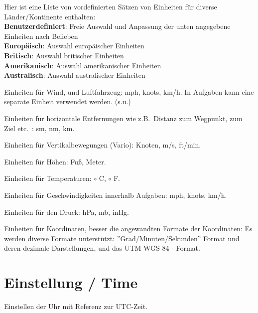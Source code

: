 \begin{description}\itemsep
\item[Vorauswahl] Hier ist eine Liste von vordefinierten Sätzen von Einheiten für diverse Länder/Kontinente enthalten:\\
{\bf Benutzerdefiniert}: Freie Auswahl und Anpassung der unten angegebene Einheiten nach Belieben\\
{\bf Europäisch}: Auswahl europäischer Einheiten   \\
{\bf Britisch}:   Auswahl britischer  Einheiten\\
{\bf Amerikanisch}:   Auswahl amerikanischer Einheiten\\
{\bf Australisch}:   Auswahl australischer Einheiten
\item[Luftfahrzeug-/Windgeschwindigkeit$\star$]  Einheiten für Wind, und Luftfahrzeug: mph, knots, km/h.
    In Aufgaben kann eine separate Einheit verwendet werden. (s.u.)
\item[Entfernungen$\star$] Einheiten für horizontale Entfernungen wie z.B.\  Distanz zum Wegpunkt, zum Ziel
    etc.\ : sm, nm, km.
\item[Steigen/Sinken$\star$] Einheiten für Vertikalbewegungen (Vario): Knoten,  m/s, ft/min.
\item[Höhen$\star$] Einheiten für Höhen: Fuß, Meter.
\item[Temperaturen$\star$] Einheiten für Temperaturen: $\circ$ C, $\circ$ F.
\item[Aufgaben-Geschwindigkeiten$\star$] Einheiten für Geschwindigkeiten innerhalb Aufgaben: mph, knots,
    km/h.
\item[Druck$\star$]  Einheiten für den Druck: hPa, mb, inHg.
\item[Geographische Länge und Breite$\star$]  Einheiten für Koordinaten, besser die angewandten Formate
    der Koordinaten:  Es werden diverse Formate unterstützt:  ''Grad/Minuten/Sekunden'' Format und
    deren dezimale Darstellungen,  und das UTM WGS 84 - Format.
\end{description}


\section{Einstellung / Time}

Einstellen der Uhr mit Referenz zur UTC-Zeit.

